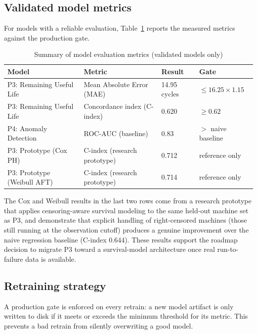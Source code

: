 \subsection{Validated model metrics}

For models with a reliable evaluation, Table~\ref{tab:metriques-ml} reports the measured metrics against the production gate.

\begin{table}[h]
\centering
\begin{tabularx}{\textwidth}{|X|X|X|X|}
\toprule
\textbf{Model} & \textbf{Metric} & \textbf{Result} & \textbf{Gate} \\
\midrule
P3: Remaining Useful Life & Mean Absolute Error (MAE)    & 14.95 cycles & $\leq 16.25 \times 1.15$ \\
\midrule
P3: Remaining Useful Life & Concordance index (C-index)  & 0.620        & $\geq 0.62$ \\
\midrule
P4: Anomaly Detection     & ROC-AUC (baseline)           & 0.83         & $>$ naive baseline \\
\midrule
P3: Prototype (Cox PH)    & C-index (research prototype) & 0.712        & reference only \\
\midrule
P3: Prototype (Weibull AFT) & C-index (research prototype) & 0.714      & reference only \\
\bottomrule
\end{tabularx}
\caption{Summary of model evaluation metrics (validated models only)}
\label{tab:metriques-ml}
\end{table}

The Cox and Weibull results in the last two rows come from a research prototype that applies censoring-aware survival modeling to the same held-out machine set as P3, and demonstrate that explicit handling of right-censored machines (those still running at the observation cutoff) produces a genuine improvement over the naive regression baseline (C-index 0.644). These results support the roadmap decision to migrate P3 toward a survival-model architecture once real run-to-failure data is available.

\subsection{Retraining strategy}

A production gate is enforced on every retrain: a new model artifact is only written to disk if it meets or exceeds the minimum threshold for its metric. This prevents a bad retrain from silently overwriting a good model.

